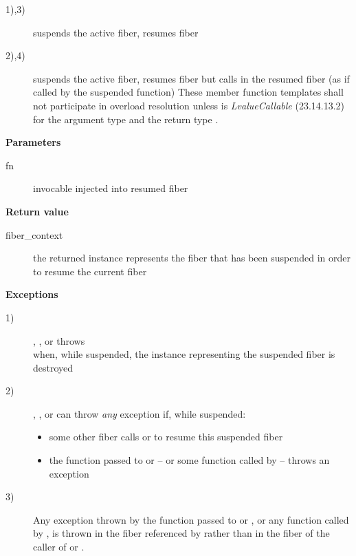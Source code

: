 \begin{description}
    \item[1),3)] suspends the active fiber, resumes fiber 
    \item[2),4)] suspends the active fiber, resumes fiber 
              but calls  in the resumed fiber (as if called by the
              suspended function)
              These member function templates shall not participate in overload
              resolution unless  is \emph{LvalueCallable} (23.14.13.2)
              for the argument type  and the return
              type \fiber.
\end{description}

{\bfseries Parameters}
\begin{description}
    \item[fn] invocable injected into resumed fiber\\
\end{description}

{\bfseries Return value}
\begin{description}
    \item[fiber\_context] the returned instance represents the fiber that has been
                 suspended in order to resume the current fiber
\end{description}

{\bfseries Exceptions}
\begin{description}
    \item[1)] \resume, \resumewith, \xtresume or \xtresumewith throws\\
              \unwindex when, while suspended, the \fiber instance representing
              the suspended fiber is destroyed
    \item[2)] \resume, \resumewith, \xtresume or \xtresumewith can
              throw \emph{any} exception if, while suspended:
              \begin{itemize}
                  \item some other fiber calls \resumewith or \xtresumewith to
                        resume this suspended fiber
                  \item the function  passed to \resumewith
                        or \xtresumewith -- or some function called
                        by  -- throws an exception
              \end{itemize}
    \item[3)] Any exception thrown by the function  passed
              to \resumewith or \xtresumewith, or any function called
              by , is thrown in the fiber referenced by 
              rather than in the fiber of the caller of \resumewith
              or \xtresumewith.
\end{description}

